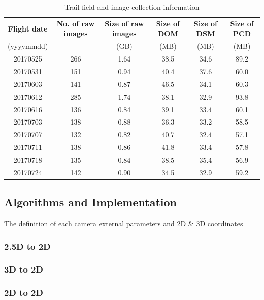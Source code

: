 \documentclass[sensors,article,submit,moreauthors, xelatex]{Definitions/mdpi}
\begin{document}
\begin{table}[H]
  \caption{Trail field and image collection information}
  \centering
  \begin{tabular}{cccccc}
    \toprule
    \textbf{Flight date}	& \textbf{No. of raw images}	& \textbf{Size of raw images} & \textbf{Size of DOM} & \textbf{Size of DSM} & \textbf{Size of PCD} \\ 
    (yyyymmdd)&     & (GB) & (MB) & (MB) & (MB) \\
    \midrule
    20170525  & 266	& 1.64 & 38.5 & 34.6 & 89.2 \\
    20170531	& 151 & 0.94 & 40.4 & 37.6 & 60.0 \\
    20170603	& 141 & 0.87 & 46.5 & 34.1 & 60.3 \\
    20170612	& 285 & 1.74 & 38.1 & 32.9 & 93.8 \\
    20170616	& 136 & 0.84 & 39.1 & 33.4 & 60.1 \\
    20170703	& 138 & 0.88 & 36.3 & 33.2 & 58.5 \\
    20170707	& 132 & 0.82 & 40.7 & 32.4 & 57.1 \\
    20170711	& 138 & 0.86 & 41.8 & 33.4 & 57.8 \\
    20170718	& 135 & 0.84 & 38.5 & 35.4 & 56.9 \\
    20170724	& 142 & 0.90 & 34.5 & 32.9 & 59.2 \\
    \bottomrule
  \end{tabular}
  \label{tab:diginfo}
\end{table}

\subsection{Algorithms and Implementation}
The definition of each camera external parameters and 2D \& 3D coordinates

\subsubsection{2.5D to 2D}

\subsubsection{3D to 2D}

\subsubsection{2D to 2D}
\end{document}
